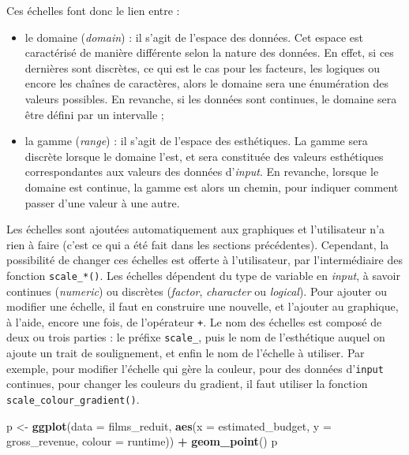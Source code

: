 \documentclass[
  11pt,
]{book}
\newenvironment{Shaded}{\begin{snugshade}}{\end{snugshade}}
\newcommand{\DataTypeTok}[1]{\textcolor[rgb]{0.13,0.29,0.53}{#1}}
\newcommand{\KeywordTok}[1]{\textcolor[rgb]{0.13,0.29,0.53}{\textbf{#1}}}
\newcommand{\NormalTok}[1]{#1}
\newcommand{\OperatorTok}[1]{\textcolor[rgb]{0.81,0.36,0.00}{\textbf{#1}}}
\newcommand{\StringTok}[1]{\textcolor[rgb]{0.31,0.60,0.02}{#1}}
\providecommand{\tightlist}{%
  \setlength{\itemsep}{0pt}\setlength{\parskip}{0pt}}
\numberwithin{equation}{section}
\numberwithin{countremarque}{section}
\begin{document}
Ces échelles font donc le lien entre :

\begin{itemize}
\tightlist
\item
  le domaine (\emph{domain}) : il s'agit de l'espace des données. Cet espace est caractérisé de manière différente selon la nature des données. En effet, si ces dernières sont discrètes, ce qui est le cas pour les facteurs, les logiques ou encore les chaînes de caractères, alors le domaine sera une énumération des valeurs possibles. En revanche, si les données sont continues, le domaine sera être défini par un intervalle ;
\item
  la gamme (\emph{range}) : il s'agit de l'espace des esthétiques. La gamme sera discrète lorsque le domaine l'est, et sera constituée des valeurs esthétiques correspondantes aux valeurs des données d'\emph{input}. En revanche, lorsque le domaine est continue, la gamme est alors un chemin, pour indiquer comment passer d'une valeur à une autre.
\end{itemize}

Les échelles sont ajoutées automatiquement aux graphiques et l'utilisateur n'a rien à faire (c'est ce qui a été fait dans les sections précédentes). Cependant, la possibilité de changer ces échelles est offerte à l'utilisateur, par l'intermédiaire des fonction \texttt{scale\_*()}. Les échelles dépendent du type de variable en \emph{input}, à savoir continues (\emph{numeric}) ou discrètes (\emph{factor}, \emph{character} ou \emph{logical}). Pour ajouter ou modifier une échelle, il faut en construire une nouvelle, et l'ajouter au graphique, à l'aide, encore une fois, de l'opérateur \texttt{+}. Le nom des échelles est composé de deux ou trois parties : le préfixe \texttt{scale\_}, puis le nom de l'esthétique auquel on ajoute un trait de soulignement, et enfin le nom de l'échelle à utiliser. Par exemple, pour modifier l'échelle qui gère la couleur, pour des données d'\texttt{input} continues, pour changer les couleurs du gradient, il faut utiliser la fonction \texttt{scale\_colour\_gradient()}.

\begin{Shaded}
\begin{Highlighting}[]
\NormalTok{p \textless{}{-}}\StringTok{ }\KeywordTok{ggplot}\NormalTok{(}\DataTypeTok{data =}\NormalTok{ films\_reduit,}
            \KeywordTok{aes}\NormalTok{(}\DataTypeTok{x =}\NormalTok{ estimated\_budget,}
                \DataTypeTok{y =}\NormalTok{ gross\_revenue, }\DataTypeTok{colour =}\NormalTok{ runtime)) }\OperatorTok{+}
\StringTok{  }\KeywordTok{geom\_point}\NormalTok{()}
\NormalTok{p}
\end{Highlighting}
\end{Shaded}
\end{document}
